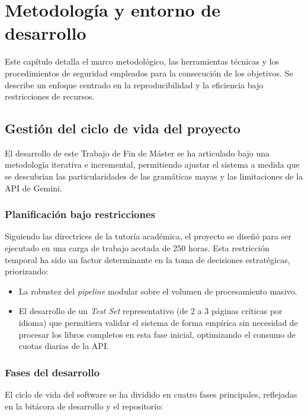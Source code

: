 \chapter{Metodología y entorno de desarrollo}

Este capítulo detalla el marco metodológico, las herramientas técnicas y los procedimientos de seguridad empleados para la consecución de los objetivos. Se describe un enfoque centrado en la reproducibilidad y la eficiencia bajo restricciones de recursos.

\section{Gestión del ciclo de vida del proyecto}

El desarrollo de este Trabajo de Fin de Máster se ha articulado bajo una metodología iterativa e incremental, permitiendo ajustar el sistema a medida que se descubrían las particularidades de las gramáticas mayas y las limitaciones de la API de Gemini.

\subsection{Planificación bajo restricciones}

Siguiendo las directrices de la tutoría académica, el proyecto se diseñó para ser ejecutado en una carga de trabajo acotada de 250 horas. Esta restricción temporal ha sido un factor determinante en la toma de decisiones estratégicas, priorizando:

\begin{itemize}
    \item La robustez del \textit{pipeline} modular sobre el volumen de procesamiento masivo.
    
    \item El desarrollo de un \textit{Test Set} representativo (de 2 a 3 páginas críticas por idioma) que permitiera validar el sistema de forma empírica sin necesidad de procesar los libros completos en esta fase inicial, optimizando el consumo de cuotas diarias de la API.
\end{itemize}

\subsection{Fases del desarrollo}

El ciclo de vida del software se ha dividido en cuatro fases principales, reflejadas en la bitácora de desarrollo y el repositorio:

